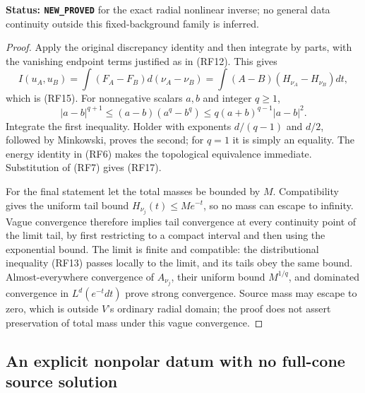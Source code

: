 \documentclass[11pt,a4paper]{article}
\numberwithin{equation}{section}
\theoremstyle{definition}
\theoremstyle{remark}
\begin{document}
\noindent\textbf{Status: \texttt{NEW\_PROVED}} for
the exact radial nonlinear inverse; no general data
continuity outside this fixed-background family is inferred.

\begin{proof}
Apply the original discrepancy identity and then
integrate by parts, with the vanishing endpoint
terms justified as in \textup{(RF12)}.  This gives
\[
 I(u_A,u_B)
  =\int(F_A-F_B)d(\nu_A-\nu_B)
  =\int(A-B)(H_{\nu_A}-H_{\nu_B})dt,
\]
which is \textup{(RF15)}.  For nonnegative scalars
$a,b$ and integer $q\ge1$,
\[
 |a-b|^{q+1}\le(a-b)(a^q-b^q)
                      \le q(a+b)^{q-1}|a-b|^2.
\]
Integrate the first inequality.  Holder with exponents
$d/(q-1)$ and $d/2$, followed by Minkowski, proves
the second; for $q=1$ it is simply an equality.
The energy identity in \textup{(RF6)} makes the
topological equivalence immediate.  Substitution
of \textup{(RF7)} gives \textup{(RF17)}.

For the final statement let the total masses be
bounded by $M$.  Compatibility gives the uniform
tail bound $H_{\nu_j}(t)\le Me^{-t}$, so no mass
can escape to infinity.  Vague convergence therefore
implies tail convergence at every continuity point
of the limit tail, by first restricting to a compact
interval and then using the exponential bound.
The limit is finite and compatible: the distributional
inequality \textup{(RF13)} passes locally to the limit,
and its tails obey the same bound.  Almost-everywhere
convergence of $A_{\nu_j}$, their uniform bound
$M^{1/q}$, and dominated convergence in $L^d(e^{-t}dt)$
prove strong convergence.  Source mass may escape to
zero, which is outside $V$'s ordinary radial domain;
the proof does not assert preservation of total mass
under this vague convergence.
\end{proof}

\subsection{An explicit nonpolar datum with no full-cone source solution}
\end{document}
